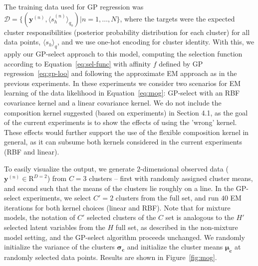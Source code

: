 \documentclass[12pt]{article}
\renewcommand{\vec}[1]{{\mathbf{#1}}}
\begin{document}
The training data used for GP regression was $\mathcal{D} = \{ (\vec{y}^{(n)}, \langle s_h^{(n)}\rangle_{q_n}) | n = 1, \dots, N \}$, where the targets were the expected cluster responsibilities (posterior probability distribution for each cluster) for all data points, $\langle s_h\rangle_{q}$, and we use one-hot encoding for cluster identity.
With this, we apply our GP-select approach to this model, computing the selection function according to Equation~\eqref{eq:sel-func} with affinity $f$ defined by GP regression~\eqref{eq:gp-loo} 
and following the approximate EM approach as in the previous experiments.
In these experiments we consider two scenarios for EM learning of the data likelihood in Equation~\eqref{eq:mog}: GP-select with an RBF covariance kernel and a linear covariance kernel.  
We do not include the composition kernel suggested (based on experiments) in Section 4.1, as the goal of the current experiments is to show the  effects of using the 'wrong' kernel. These effects would further support the use of the flexible composition kernel in general, as it can subsume both kernels considered in the current experiments (RBF and linear). 

To easily visualize the output, we generate $2$-dimensional observed data ($\vec{y}^{(n)} \in \mathrm{R}^{D=2} $) from $C=3$ clusters -- first with randomly assigned cluster means, and second such that the means of the clusters lie roughly on a line.
In the GP-select experiments, we select $C' = 2$ clusters from the full set,
and run $40$ EM iterations for both kernel choices (linear and RBF).
Note that for mixture models, the notation of $C'$ selected clusters of the $C$ set is analogous to the $H'$ selected latent variables from the $H$ full set, as described in the non-mixture model setting, and the GP-select algorithm proceeds unchanged.
We randomly initialize the variance of the clusters $\vec{\sigma_c}$ and initialize the cluster means $\vec{\mu_c}$ at randomly selected data points.
Results are shown in Figure~\ref{fig:mog}.

\begin{figure*}[t]
\begin{center}
\caption{Gaussian mixture model results using GP-select (selection of $C'=2$ in a $C=3$ class scenario) for inference.
Progress of the inference is shown using (row one) an RBF covariance kernel in the regression, and (row two) a linear covariance kernel.
For each iteration shown, we see (1) the observed data and their inferred cluster assignments and (2) the $C$ corresponding GP regression functions learned/used for GP-select in that iteration. Different iterations are pictured due to different convergence rates. As shown, inference with GP-select using a linear kernel is unable to assign the data points to the appropriate clusters, whereas GP-select with an RBF kernel succeeds.}\label{fig:mog}
\end{center}
\end{figure*}
\end{document}
